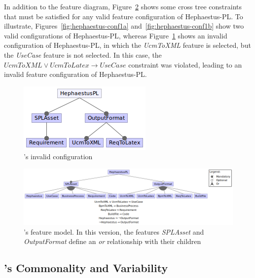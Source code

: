 In addition to the feature diagram, Figure~\ref{fig:hephaestus-fm-03} shows some cross tree constraints that must be satisfied for any valid feature configuration of Hephaestus-PL. 
To illustrate, Figures~\ref{fig:hephaestus-conf1a} and~\ref{fig:hephaestus-conf1b} show two valid configurations of Hephaestus-PL, whereas Figure~\ref{fig:hephaestus-conf-invalid} shows an invalid configuration of Hephaestus-PL, in which
the \emph{UcmToXML} feature is selected, but the \emph{UseCase} feature is not selected. In this case,
the $UcmToXML \lor UcmToLatex \rightarrow Use Case$ constraint was violated, leading to an invalid feature
configuration of Hephaestus-PL.


\begin{figure}[htb]
\begin{center}
\includegraphics[scale=0.6]{imagens/confInvalid.png}
\end{center}
\caption{\hpl's invalid configuration}
\label{fig:hephaestus-conf-invalid}
\end{figure}





\begin{figure}[bth]
\begin{center}
\includegraphics[scale=0.5]{imagens/fm-hpl.png}
\end{center}
\caption{\hpl's feature model. In this version, the features \textit{SPLAsset} and \textit{OutputFormat}
  define an \emph{or} relationship with their children}
\label{fig:hephaestus-fm-03}
\end{figure}





\subsection{\hpl's Commonality and Variability} \label{domain-analysis-hpl}

